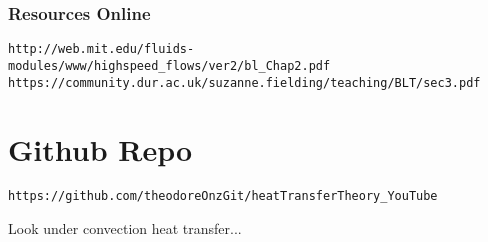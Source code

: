 \documentclass[11pt]{article}
\begin{document}
\section{Resources Online}


\begin{verbatim}
http://web.mit.edu/fluids-modules/www/highspeed_flows/ver2/bl_Chap2.pdf
https://community.dur.ac.uk/suzanne.fielding/teaching/BLT/sec3.pdf
\end{verbatim}

\part{Github Repo}
\begin{verbatim}
https://github.com/theodoreOnzGit/heatTransferTheory_YouTube
\end{verbatim}

Look under convection heat transfer...
\end{document}
